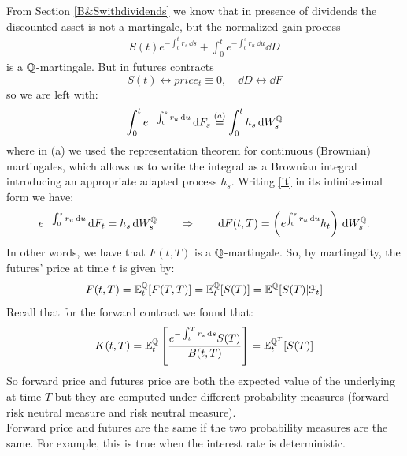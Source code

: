 From Section \ref{B&Swithdividends} we know that in presence of dividends the discounted asset is not a martingale, but the normalized gain process
\begin{align}
    S(t)e^{-\int_0^t r_s\,\dd s} + \int_0^t e^{-\int_0^s r_u\,\dd u}\dd D
\end{align}
is a $\mathbb{Q}$-martingale. But in futures contracts
\begin{equation*}
    S(t) \leftrightarrow price_t \equiv 0, \quad \dd D \leftrightarrow \dd F
\end{equation*}
so we are left with:
\begin{align}\label{it}
    \int_0^t e^{-\int_0^s r_u\,\dd u}\,\dd F_s \overset{(a)}{=} \int_0^t h_s\,\dd W_s^{\mathbb{Q}}
\end{align}
where in (a) we used the representation theorem for continuous (Brownian) martingales, which allows us to write the integral as a Brownian integral introducing an appropriate adapted process $h_s$. Writing \eqref{it} in its infinitesimal form we have:
\begin{equation}
    e^{-\int_0^s r_u\,\dd u}\,\dd F_t = h_s\,\dd W_s^{\mathbb{Q}} \qquad\Rightarrow\qquad \dd F(t,T) = \left(e^{\int_0^s r_u\,\dd u}h_t\right)\,\dd W_s^{\mathbb{Q}}.
\end{equation}
In other words, we have that $F(t,T)$ is a $\mathbb{Q}$-martingale. So, by martingality, the futures' price at time $t$ is given by:
\begin{equation}\label{futurespriceattimet}
    F(t,T) = \mathbb{E}^{\mathbb{Q}}_t[F(T,T)] = \mathbb{E}^{\mathbb{Q}}_t[S(T)] = \mathbb{E}^{\mathbb{Q}}[S(T)|\mathcal{F}_t]
\end{equation}
Recall that for the forward contract we found that:
\begin{equation}
    K(t,T) = \mathbb{E}^{\mathbb{Q}}_t\left[\dfrac{e^{-\int_t^T r_s\,\dd s}S(T)}{B(t,T)}\right] = \mathbb{E}^{\mathbb{Q}^T}_t[S(T)]
\end{equation}
So forward price and futures price are both the expected value of the underlying at time $T$ but they are computed under different probability measures (forward risk neutral measure and risk neutral measure). \\
Forward price and futures are the same if the two probability measures are the same. For example, this is true when the interest rate is deterministic.

